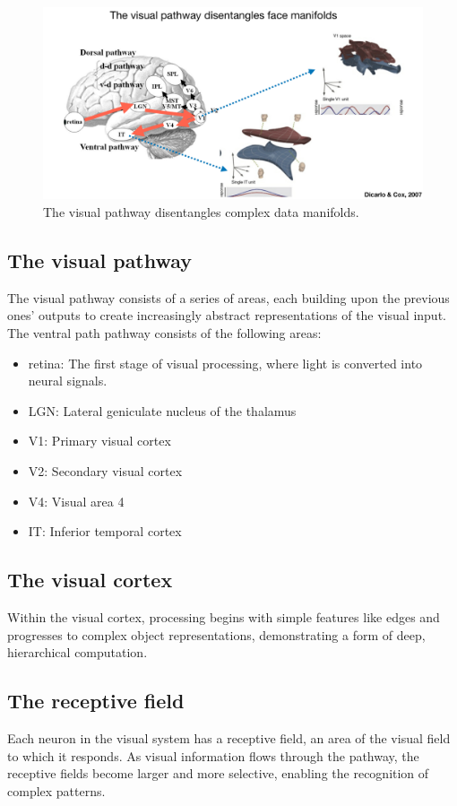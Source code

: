 \documentclass[11pt]{book} %
\begin{document}
\begin{figure}[ht]
    \centering
    \includegraphics[width=\textwidth]{./Figs/visual_pathway_manifold.jpeg}
    \caption{The visual pathway disentangles complex data manifolds.}
    \label{fig:visual_pathway}
\end{figure}

\subsection{The visual pathway}
The visual pathway consists of a series of areas, each building upon the previous ones' outputs to create increasingly abstract representations of the visual input.
The ventral path pathway consists of the following areas:
\begin{itemize}
    \item retina: The first stage of visual processing, where light is converted into neural signals.
    \item LGN: Lateral geniculate nucleus of the thalamus 
    \item V1: Primary visual cortex
    \item V2: Secondary visual cortex
    \item V4: Visual area 4
    \item IT: Inferior temporal cortex
\end{itemize}

\subsection{The visual cortex}
Within the visual cortex, processing begins with simple features like edges and progresses to complex object representations, 
demonstrating a form of deep, hierarchical computation.

\subsection{The receptive field}
Each neuron in the visual system has a receptive field, an area of the visual field to which it responds. 
As visual information flows through the pathway, the receptive fields become larger and more selective, enabling the recognition of complex patterns.
\end{document}
